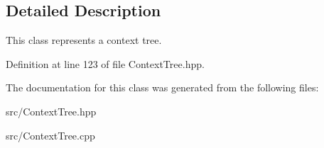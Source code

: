 \subsection{Detailed Description}
This class represents a context tree. 

Definition at line 123 of file Context\+Tree.\+hpp.



The documentation for this class was generated from the following files\+:\begin{DoxyCompactItemize}
\item 
src/Context\+Tree.\+hpp\item 
src/Context\+Tree.\+cpp\end{DoxyCompactItemize}
